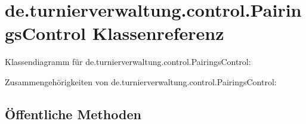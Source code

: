 \hypertarget{classde_1_1turnierverwaltung_1_1control_1_1_pairings_control}{}\section{de.\+turnierverwaltung.\+control.\+Pairings\+Control Klassenreferenz}
\label{classde_1_1turnierverwaltung_1_1control_1_1_pairings_control}


Klassendiagramm für de.\+turnierverwaltung.\+control.\+Pairings\+Control\+:


Zusammengehörigkeiten von de.\+turnierverwaltung.\+control.\+Pairings\+Control\+:
\subsection*{Öffentliche Methoden}
